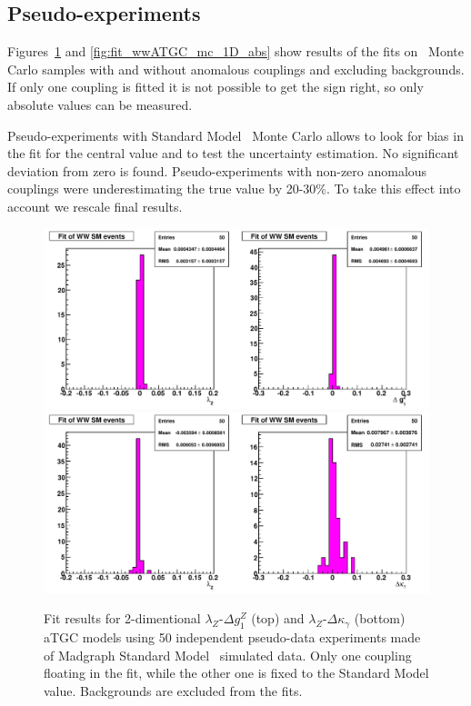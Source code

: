 \subsection{Pseudo-experiments}
Figures~\ref{fig:fit_ww_mc_1D} and \ref{fig:fit_wwATGC_mc_1D_abs} show
results of the fits on \ww\ Monte Carlo samples with and without
anomalous couplings and excluding backgrounds. If only one coupling is
fitted it is not possible to get the sign right, so only absolute
values can be measured.

Pseudo-experiments with Standard Model \ww\ Monte Carlo allows to look
for bias in the fit for the central value and to test the uncertainty
estimation. No significant deviation from zero is
found. Pseudo-experiments with non-zero anomalous couplings were
underestimating the true value by 20-30\%. To take this effect into
account we rescale final results.

\begin{figure}[tp]
  \centering
    \includegraphics[width=1.0\textwidth]{figures/fit_ww_mc_1D}
    \includegraphics[width=1.0\textwidth]{figures/fit_ww_mc_1D_2}

  \caption[1D fits to WW SM Monte Carlo] {Fit results for
  2-dimentional $\lambda_{Z}$-$\Delta g^Z_1$ (top) and
  $\lambda_{Z}$-$\Delta\kappa_\gamma$ (bottom) aTGC models using 50
  independent pseudo-data experiments made of Madgraph Standard
  Model \ww\ simulated data. Only one coupling floating in the fit,
  while the other one is fixed to the Standard Model
  value. Backgrounds are excluded from the fits.}

\label{fig:fit_ww_mc_1D}
\end{figure}


